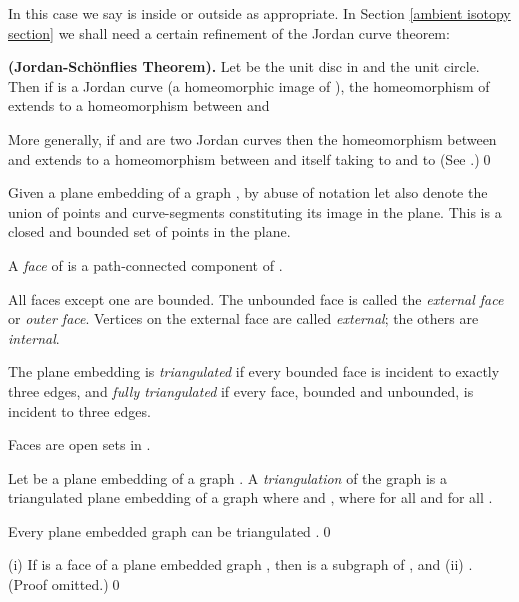 In this case we say  is inside or outside  as appropriate.
In Section \ref{ambient isotopy section}
we shall need a certain refinement of the Jordan curve theorem:

\begin{proposition}
\label{schoenflies theorem} {\bf (Jordan-Sch\"onflies Theorem).}
Let  be the unit disc in  and 
the unit circle.  Then if  is a Jordan curve (a homeomorphic
image of ), the homeomorphism of 
extends to a homeomorphism between  and 

More generally, if  and  are two Jordan curves then
the homeomorphism between  and  extends to a homeomorphism
between  and itself taking  to 
and  to 
(See {\rm \cite{moise}}.)\qed
\end{proposition}


\begin{definition}
\label{faces of graph} Given a plane embedding  of a graph , by abuse of notation
let  also denote the union of points and curve-segments
constituting its image in the plane.  This is a closed and
bounded set of points in the plane.

A {\em face} of  is a path-connected component
of .

All faces except one are bounded.  The unbounded face
is called the {\em external face} or {\em outer face}.  Vertices on the
external face  are called {\em external}; the others are
{\em internal}.

The plane embedding is {\em triangulated} if every bounded
face is incident to exactly three edges, and {\em fully triangulated}
if every face, bounded and unbounded, is incident to three edges.
\end{definition}

Faces are open sets in .

\begin{definition}
\label{triangulation} Let  be a plane embedding of a graph
. A {\em triangulation} of the
graph is a triangulated plane embedding  of
a graph  where  and
, where  for all
 and  for all .
\end{definition}

\begin{proposition}
\label{all embeddings triangulable} Every plane embedded graph can be triangulated
{\rm \cite{kant}}.\qed
\end{proposition}

\begin{proposition}
\label{partial F is a subgraph} {\rm (i)} If  is a face of a plane embedded graph ,
then  is a subgraph of , and
{\rm (ii)} . (Proof omitted.)\qed
\end{proposition}


